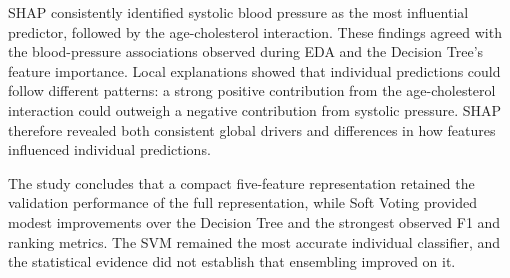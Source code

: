 \documentclass[11pt,a4paper]{article}
\begin{document}
SHAP consistently identified systolic blood pressure as the most influential predictor, followed by the age-cholesterol interaction. These findings agreed with the blood-pressure associations observed during EDA and the Decision Tree’s feature importance. Local explanations showed that individual predictions could follow different patterns: a strong positive contribution from the age-cholesterol interaction could outweigh a negative contribution from systolic pressure. SHAP therefore revealed both consistent global drivers and differences in how features influenced individual predictions.

The study concludes that a compact five-feature representation retained the validation performance of the full representation, while Soft Voting provided modest improvements over the Decision Tree and the strongest observed F1 and ranking metrics. The SVM remained the most accurate individual classifier, and the statistical evidence did not establish that ensembling improved on it.
\end{document}
